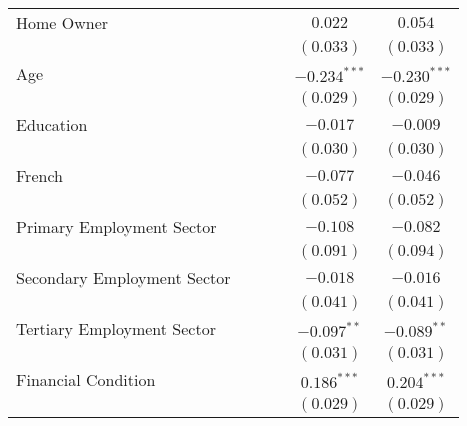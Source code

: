 \begin{center}
\begin{tiny}
\begin{longtable}{l@{} c@{} c@{} c@{} c@{} c@{}}
\quad Home Owner                        &                &                  &                & $0.022$          & $0.054$        \\
                                        &                &                  &                & $(0.033)$        & $(0.033)$      \\
\quad Age                               &                &                  &                & $-0.234^{***}$   & $-0.230^{***}$ \\
                                        &                &                  &                & $(0.029)$        & $(0.029)$      \\
\quad Education                         &                &                  &                & $-0.017$         & $-0.009$       \\
                                        &                &                  &                & $(0.030)$        & $(0.030)$      \\
\quad French                            &                &                  &                & $-0.077$         & $-0.046$       \\
                                        &                &                  &                & $(0.052)$        & $(0.052)$      \\
\quad Primary Employment Sector         &                &                  &                & $-0.108$         & $-0.082$       \\
                                        &                &                  &                & $(0.091)$        & $(0.094)$      \\
\quad Secondary Employment Sector       &                &                  &                & $-0.018$         & $-0.016$       \\
                                        &                &                  &                & $(0.041)$        & $(0.041)$      \\
\quad Tertiary Employment Sector        &                &                  &                & $-0.097^{**}$    & $-0.089^{**}$  \\
                                        &                &                  &                & $(0.031)$        & $(0.031)$      \\
\quad Financial Condition               &                &                  &                & $0.186^{***}$    & $0.204^{***}$  \\
                                        &                &                  &                & $(0.029)$        & $(0.029)$      \\

\end{longtable}
\end{tiny}
\end{center}
